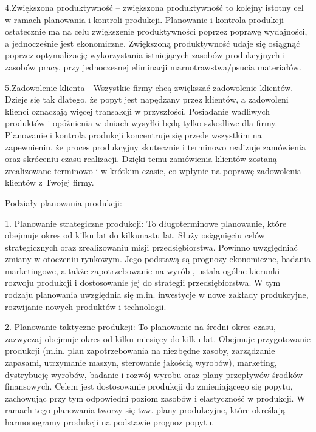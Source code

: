 4.Zwiększona produktywność – zwiększona produktywność to kolejny istotny cel w ramach planowania i kontroli produkcji. Planowanie i kontrola produkcji ostatecznie ma na celu zwiększenie produktywności poprzez poprawę wydajności, a jednocześnie jest ekonomiczne. Zwiększoną produktywność udaje się osiągnąć poprzez optymalizację wykorzystania istniejących zasobów produkcyjnych i zasobów pracy, przy jednoczesnej eliminacji marnotrawstwa/psucia materiałów.

5.Zadowolenie klienta - Wszystkie firmy chcą zwiększać zadowolenie klientów. Dzieje się tak dlatego, że popyt jest napędzany przez klientów, a zadowoleni klienci oznaczają więcej transakcji w przyszłości. Posiadanie wadliwych produktów i opóźnienia w dniach wysyłki będą tylko szkodliwe dla firmy. Planowanie i kontrola produkcji koncentruje się przede wszystkim na zapewnieniu, że proces produkcyjny skutecznie i terminowo realizuje zamówienia oraz skróceniu czasu realizacji. Dzięki temu zamówienia klientów zostaną zrealizowane terminowo i w krótkim czasie, co wpłynie na poprawę zadowolenia klientów z Twojej firmy.





Podziały planowania produkcji:

    1. Planowanie strategiczne produkcji: To długoterminowe planowanie, które obejmuje okres od kilku lat do kilkunastu lat. Służy osiągnięciu celów strategicznych oraz zrealizowaniu misji przedsiębiorstwa. Powinno uwzględniać zmiany w otoczeniu rynkowym. Jego podstawą są prognozy ekonomiczne, badania marketingowe, a także zapotrzebowanie na wyrób , ustala ogólne kierunki rozwoju produkcji i dostosowanie jej do strategii przedsiębiorstwa. W tym rodzaju planowania uwzględnia się m.in. inwestycje w nowe zakłady produkcyjne, rozwijanie nowych produktów i technologii.
    
    2. Planowanie taktyczne produkcji: To planowanie na średni okres czasu, zazwyczaj obejmuje okres od kilku miesięcy do kilku lat. Obejmuje przygotowanie produkcji (m.in. plan zapotrzebowania na niezbędne zasoby, zarządzanie zapasami, utrzymanie maszyn, sterowanie jakością wyrobów), marketing, dystrybucję wyrobów, badanie i rozwój wyrobu oraz plany przepływów środków finansowych. Celem jest dostosowanie produkcji do zmieniającego się popytu, zachowując przy tym odpowiedni poziom zasobów i elastyczność w produkcji. W ramach tego planowania tworzy się tzw. plany produkcyjne, które określają harmonogramy produkcji na podstawie prognoz popytu.
    
